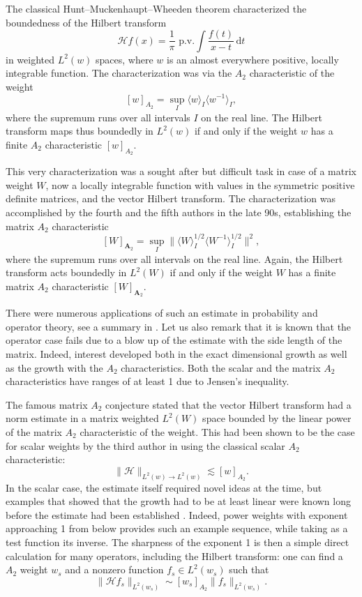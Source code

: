 \documentclass{amsart}
\theoremstyle{definition}
\theoremstyle{remark}
\begin{document}
The classical Hunt--Muckenhaupt--Wheeden theorem \cite{HuMuWh} characterized the boundedness of the Hilbert transform
$$\mathcal{H}f(x)=\frac1{\pi}\text{ p.v.}\int \frac{f(t)}{x-t}\,\mathrm{d}t$$
in weighted $L^2(w)$ spaces, where $w$ is an almost everywhere positive, locally integrable function.  The characterization was via the $A_2$ characteristic of the weight
\begin{equation}
    \label{eq:scalar_A2_characteristic}
    [w]_{{A}_2}=\sup_{I}\langle w \rangle_I \langle w^{-1} \rangle_I,    
\end{equation}
where the supremum runs over all intervals $I$ on the real line. The Hilbert transform maps thus boundedly in $L^2(w)$ if and only if the weight $w$ has a finite $A_2$ characteristic $[w]_{{A}_2}$.

This very characterization was a sought after but difficult task in case of a matrix weight $W$, now a locally integrable function with values in the symmetric positive definite matrices, and the vector Hilbert transform. The characterization was accomplished by the fourth and the fifth authors \cite{TrVo} in the late 90s, establishing the matrix $A_2$ characteristic
$$[W]_{\mathbf{A}_2}=\sup_{I}\|\langle W \rangle_I^{1/2} \langle W^{-1} \rangle_I^{1/2}\|^2,$$ where the supremum runs over all intervals on the real line. Again, the Hilbert transform acts boundedly in $L^2(W)$ if and only if the weight $W$ has a finite matrix $A_2$ characteristic $[W]_{\mathbf{A}_2}.$ 

There were numerous applications of such an estimate in probability and operator theory, see a summary in \cite{DoPeTrVo}. Let us also remark that it is known that the operator case fails \cite{GiPoTrVo} due to a blow up of the estimate with the side length of the matrix. Indeed, interest developed both in the exact dimensional growth as well as the growth with the $A_2$ characteristics. Both the scalar and the matrix $A_2$ characteristics have ranges of at least 1 due to Jensen's inequality.

The famous matrix $A_2$ conjecture stated that the vector Hilbert transform had a norm estimate in a matrix weighted $L^2(W)$ space bounded by the linear power of the matrix $A_2$ characteristic of the weight. This had been shown to be the case for scalar weights by the third author in \cite{Pe} using the classical scalar $A_2$ characteristic: 
$$\|\mathcal{H}\|_{L^2(w)\to L^2(w)}\lesssim [w]_{{A}_2}.$$
In the scalar case, the estimate itself required novel ideas at the time, but examples that showed that the growth had to be at least linear were known long before the estimate had been established \cite{Bu}. Indeed, power weights with exponent  approaching 1 from below provides such an example sequence, while taking as a test function its inverse. The sharpness of the exponent 1 is then a simple direct calculation for many operators, including the Hilbert transform: one can find a $A_2$ weight $w_s$ and a nonzero function $f_s\in L^2(w_s)$ such that
$$\|\mathcal{H}f_s\|_{L^2(w_s)}\sim [w_s]_{A_2}\|f_s\|_{L^2(w_s)}.$$
\end{document}
